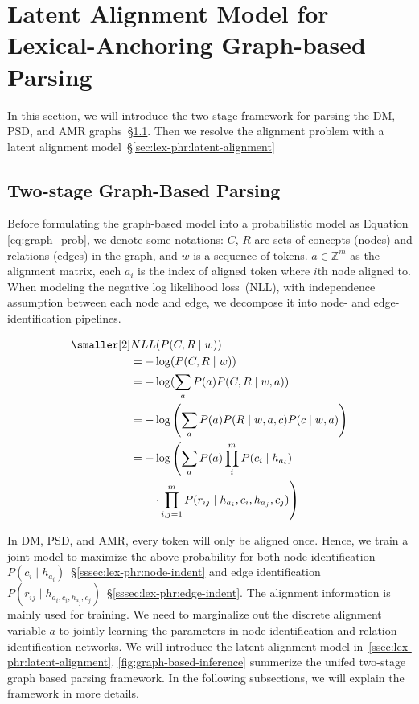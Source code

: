 \section{Latent Alignment Model for Lexical-Anchoring Graph-based Parsing}
\label{sec:lex-phr:graph-based}

In this section, we will introduce the two-stage framework for parsing
the DM, PSD, and AMR graphs~\S\ref{sec:lex-phr:two-stage}. Then we
resolve the alignment problem with a latent alignment model~\S\ref{sec:lex-phr:latent-alignment}

\subsection{Two-stage Graph-Based Parsing}
\label{sec:lex-phr:two-stage}

Before formulating the graph-based model into a probabilistic model as
Equation \ref{eq:graph_prob}, we denote some notations: $C$, $R$ are
sets of concepts (nodes) and relations (edges) in the graph, and $w$
is a sequence of tokens.  $a \in {\mathbb{Z}}^m$ as the alignment
matrix, each $a_{i}$ is the index of aligned token where $i$th node
aligned to. When modeling the negative log likelihood loss~(NLL), with
independence assumption between each node and edge, we decompose it
into node- and edge-identification pipelines.

\begin{equation}
  \label{eq:graph_prob}
\begin{aligned} \smaller[2]
 & NLL(P(C,R \mid w)) \\
 & = - \log(P(C,R \mid w)) \\
 & = - \log(\sum_{a}{P(a) P(C,R \mid w,a)}) \\
 & = - \log\left(\sum_{a}P(a) P(R\mid w,a,c) P(c \mid w, a)\right) \\
 & = - \log\left(\sum_{a}P(a) \prod_{i}^{m} P(c_{i} \mid h_{a_{i}}) \right. \\
 & \qquad \left.\cdot \prod_{i,j=1}^{m}P(r_{ij} \mid h_{a_{i}}, c_{i}, h_{a_{j}}, c_{j})\right)
\end{aligned}
\end{equation}

In DM, PSD, and AMR, every token will only be aligned once.  Hence, we
train a joint model to maximize the above probability for both node
identification
$P(c_{i} \mid h_{a_{i}})$~\S\ref{sssec:lex-phr:node-indent} and edge
identification
$P(r_{ij} \mid h_{{a_{i}}, c_{i},h_{a_{j}},
  c_{j}})$~\S\ref{sssec:lex-phr:edge-indent}. The alignment
information is mainly used for training. We need to marginalize out
the discrete alignment variable $a$ to jointly learning the parameters
in node identification and relation identification networks. We will
introduce the latent alignment model
in~\autoref{ssec:lex-phr:latent-alignment}. \autoref{fig:graph-based-inference}
summerize the unifed two-stage graph based parsing framework. In the
following subsections, we will explain the framework in more details.

